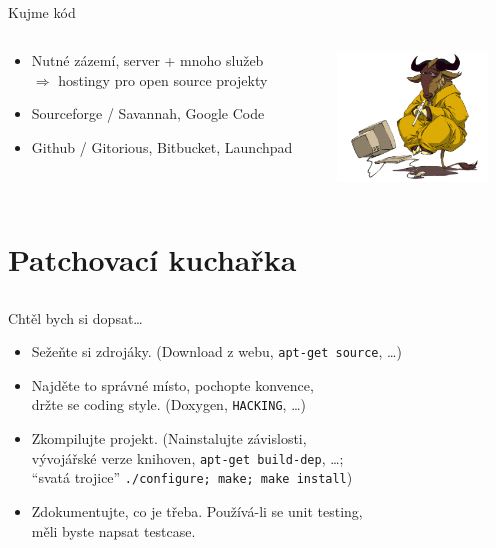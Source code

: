 \documentclass{beamer}
\begin{document}
\subsection{}
\begin{frame}{Kujme kód}
\begin{columns}
\begin{column}{7cm}
\begin{itemize}
\item Nutné zázemí, server + mnoho služeb \\ $\Rightarrow$ hostingy pro open source projekty
\item Sourceforge / Savannah, Google Code
\item Github / Gitorious, Bitbucket, Launchpad
\end{itemize}
\end{column}
\begin{column}{4cm}
\includegraphics[width=4cm]{meditate.png}
\end{column}
\end{columns}
\end{frame}


\section{Patchovací kuchařka}

\subsection{}
\begin{frame}{Chtěl bych si dopsat\dots}
\begin{itemize}
\item Sežeňte si zdrojáky. (Download z webu, {\tt apt-get source}, \dots)
\item Najděte to správné místo, pochopte konvence,\\držte se coding style. (Doxygen, {\tt HACKING}, \dots)
\item Zkompilujte projekt. (Nainstalujte závislosti,\\vývojářské verze knihoven, {\tt apt-get build-dep}, \dots;\\``svatá trojice'' {\tt ./configure; make; make install})
\item Zdokumentujte, co je třeba. Používá-li se unit testing,\\měli byste napsat testcase.
\end{itemize}
\end{frame}
\end{document}
